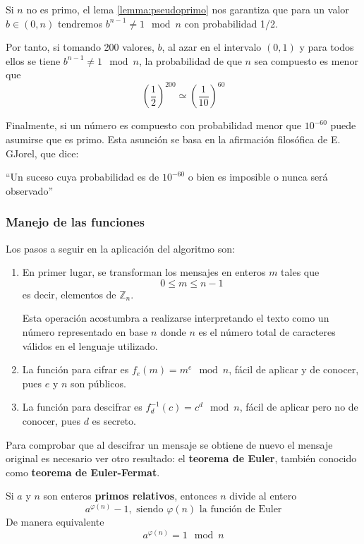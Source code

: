 \documentclass[nochap]{apuntesURJC}
\begin{document}
Si $n$ no es primo, el lema \ref{lemma:pseudoprimo} nos garantiza que para un valor $b \in (0,n)$ tendremos $b^{n-1}\neq 1 \mod n$ con probabilidad 1/2.

Por tanto, si tomando 200 valores, $b$, al azar en el intervalo $(0,1)$ y para todos ellos se tiene $b^{n-1}\neq 1 \mod n$, la probabilidad de que $n$ sea compuesto es menor que
\[\left( \frac{1}{2} \right)^{200} \simeq \left( \frac{1}{10}\right) ^{60}\]

Finalmente, si un número es compuesto con probabilidad menor que $10^{-60}$ puede asumirse que es primo. Esta asunción se basa en la afirmación filosófica de E. GJorel, que dice:
\begin{center}
``Un suceso cuya probabilidad es de $10^{-60}$ o bien es imposible o nunca será observado''
\end{center}

\subsubsection{Manejo de las funciones}

Los pasos a seguir en la aplicación del algoritmo son:
\begin{enumerate}
\item En primer lugar, se transforman los mensajes en enteros $m$ tales que
\[0 \leq m \leq n-1\]
es decir, elementos de $\mathbb{Z}_n$.

Esta operación acostumbra a realizarse interpretando el texto como un número representado en base $n$ donde $n$ es el número total de caracteres válidos en el lenguaje utilizado.

\item La función para cifrar es $f_e(m)=m^e \mod n$, fácil de aplicar y de conocer, pues $e$ y $n$ son públicos.

\item La función para descifrar es $f_d^{-1}(c)=c^d \mod n$, fácil de aplicar pero no de conocer, pues $d$ es secreto.

\end{enumerate}

Para comprobar que al descifrar un mensaje se obtiene de nuevo el mensaje original es necesario ver otro resultado: el \textbf{teorema de Euler}, también conocido como \textbf{teorema de Euler-Fermat}.

\begin{theorem}
Si $a$ y $n$ son enteros \textbf{primos relativos}, entonces $n$ divide al entero
\[a^{\varphi(n)}-1, \text{ siendo } \varphi(n) \text{ la función de Euler}\]
De manera equivalente
\[a^{\varphi(n)}=1 \mod n\]
\end{theorem}
\end{document}

